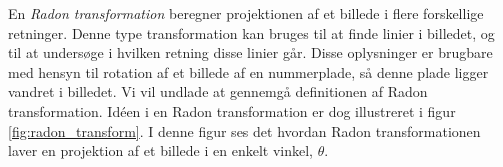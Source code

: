 En \textit{Radon transformation} beregner projektionen af et billede i flere forskellige retninger\cite{matlab_radon}. Denne type transformation kan bruges til at finde linier i billedet, og til at undersøge i hvilken retning disse linier går. Disse oplysninger er brugbare med hensyn til rotation af et billede af en nummerplade, så denne plade ligger vandret i billedet. Vi vil undlade at gennemgå definitionen af Radon transformation. Idéen i en Radon transformation er dog illustreret i figur \vref{fig:radon_transform}. I denne figur ses det hvordan Radon transformationen laver en projektion af et billede i en enkelt vinkel, $\theta$. 







